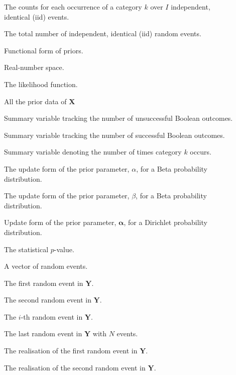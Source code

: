 \begin{description}
	\item [\parbox{2cm}{$\boldsymbol{N}$}] The counts for each occurrence of a category $k$ over $I$ independent, identical (iid) events.
	\item [\parbox{2cm}{$I$}] The total number of independent, identical (iid) random events.
	\item [\parbox{2cm}{$\mathcal{A}(v)$}] Functional form of priors.
	\item [\parbox{2cm}{$\mathbb{R}$}] Real-number space.
	\item [\parbox{2cm}{$\mathcal{L}$}] The likelihood function.
	\item [\parbox{2cm}{$\boldsymbol{\mathcal{D}}$}] All the prior data of $\boldsymbol{X}$
	\item [\parbox{2cm}{$N_{0}$}] Summary variable tracking the number of unsuccessful Boolean outcomes.
	\item [\parbox{2cm}{$N_{1}$}] Summary variable tracking the number of successful Boolean outcomes.
	\item [\parbox{2cm}{$N_{K}$}] Summary variable denoting the number of times category $k$ occurs.
	\item [\parbox{2cm}{$\alpha'$ }] The update form of the prior parameter, $\alpha$, for a Beta probability distribution.
	\item [\parbox{2cm}{$\beta'$ }] The update form of the prior parameter, $\beta$, for a Beta probability distribution.
	\item [\parbox{2cm}{$\boldsymbol{\alpha'}$}] Update form of the prior parameter, $\boldsymbol{\alpha}$, for a Dirichlet probability distribution.
	\item [\parbox{2cm}{$p$}] The statistical $p$-value.
	\item [\parbox{2cm}{$\boldsymbol{Y}$}] A vector of random events.
	\item [\parbox{2cm}{$Y_{1}$}] The first random event in $\boldsymbol{Y}$.
	\item [\parbox{2cm}{$Y_{2}$}] The second random event in $\boldsymbol{Y}$.
	\item [\parbox{2cm}{$Y_{i}$}] The $i$-th random event in $\boldsymbol{Y}$.
	\item [\parbox{2cm}{$Y_{N}$}] The last random event in $\boldsymbol{Y}$ with $N$ events.
	\item [\parbox{2cm}{$y_{1}$}] The realisation of the first random event in $\boldsymbol{Y}$.
	\item [\parbox{2cm}{$y_{2}$}] The realisation of the second random event in $\boldsymbol{Y}$.

\end{description}
